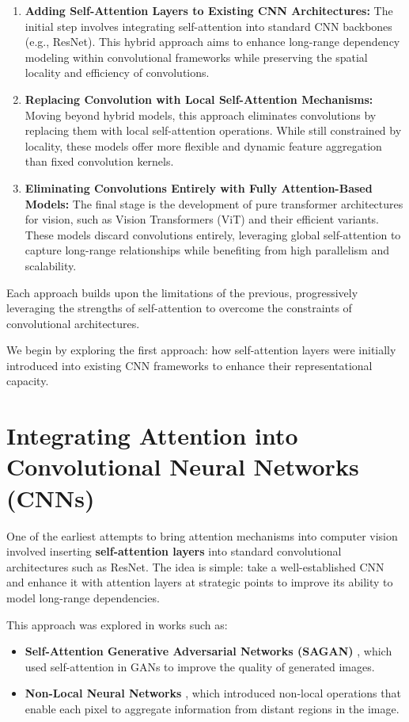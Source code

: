 \begin{enumerate}
    \item \textbf{Adding Self-Attention Layers to Existing CNN Architectures:} The initial step involves integrating self-attention into standard CNN backbones (e.g., ResNet). This hybrid approach aims to enhance long-range dependency modeling within convolutional frameworks while preserving the spatial locality and efficiency of convolutions.
    
    \item \textbf{Replacing Convolution with Local Self-Attention Mechanisms:} Moving beyond hybrid models, this approach eliminates convolutions by replacing them with local self-attention operations. While still constrained by locality, these models offer more flexible and dynamic feature aggregation than fixed convolution kernels.
    
    \item \textbf{Eliminating Convolutions Entirely with Fully Attention-Based Models:} The final stage is the development of pure transformer architectures for vision, such as Vision Transformers (ViT) and their efficient variants. These models discard convolutions entirely, leveraging global self-attention to capture long-range relationships while benefiting from high parallelism and scalability.
\end{enumerate}

\noindent Each approach builds upon the limitations of the previous, progressively leveraging the strengths of self-attention to overcome the constraints of convolutional architectures. 

\noindent We begin by exploring the first approach: how self-attention layers were initially introduced into existing CNN frameworks to enhance their representational capacity.

\section{Integrating Attention into Convolutional Neural Networks (CNNs)}

\noindent One of the earliest attempts to bring attention mechanisms into computer vision involved inserting \textbf{self-attention layers} into standard convolutional architectures such as ResNet. The idea is simple: take a well-established CNN and enhance it with attention layers at strategic points to improve its ability to model long-range dependencies.

\noindent This approach was explored in works such as:
\begin{itemize}
    \item \textbf{Self-Attention Generative Adversarial Networks (SAGAN)} \cite{zhang2019_sagan}, which used self-attention in GANs to improve the quality of generated images.
    \item \textbf{Non-Local Neural Networks} \cite{wang2018_nonlocal_nn}, which introduced non-local operations that enable each pixel to aggregate information from distant regions in the image.
\end{itemize}

